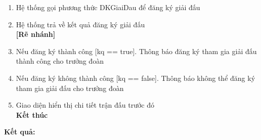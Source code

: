 \begin{enumerate}
  \item Hệ thống gọi phương thức DKGiaiDau để đăng ký giải đấu
  \item Hệ thống trả về kết quả đăng ký giải đấu
        \\\textbf{[Rẽ nhánh]}
  \item Nếu đăng ký thành công [kq == true]. Thông báo đăng ký tham gia giải đấu thành công cho trưởng đoàn
  \item Nếu đăng ký không thành công [kq == false]. Thông báo không thể đăng ký tham gia giải đấu cho trưởng đoàn
  \item Giao diện hiển thị chi tiết trận đấu trước đó
        \\\textbf{Kết thúc}

\end{enumerate}

\noindent
\textbf{Kết quả:}

